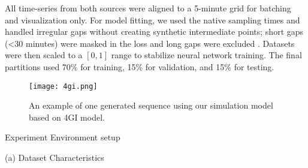 \documentclass[9pt,shortpaper,twoside,web]{ieeecolor}
\begin{document}
All time-series from both sources were aligned to a 5-minute grid for batching and visualization only. For model fitting, we used the native sampling times and handled irregular gaps without creating synthetic intermediate points; short gaps (<30 minutes) were masked in the loss and long gaps were excluded \cite{moritz2015missing}. Datasets were then scaled to a $[0,1]$ range to stabilize neural network training. The final partitions used 70\% for training, 15\% for validation, and 15\% for testing.

\begin{figure}
    \centering
    \texttt{[image: 4gi.png]}
    \caption{An example of one generated sequence using our simulation model based on 4GI model.}
    \label{fig:4gi}
\end{figure}

\begin{table}[t]
\centering
\caption{Experiment Environment setup}
\label{tab:setup}
\begin{minipage}{0.48\textwidth}
    \centering
    \caption*{(a) Dataset Characteristics} 
\end{minipage}
\hfill
\begin{minipage}{0.48\textwidth}
    \centering
    \caption*{(b) Neural Network Hyperparameters}
\end{minipage}
\end{table}
\end{document}
